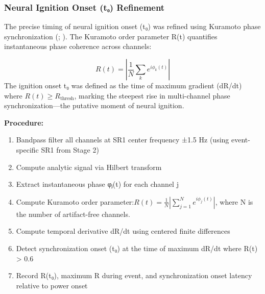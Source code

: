 \documentclass[11pt,a4paper]{article}
\begin{document}
\subsubsection{Neural Ignition Onset (t₀) Refinement}
The precise timing of neural ignition onset (t₀) was refined using Kuramoto phase synchronization (\cite{kuramoto1984chemical}; \cite{strogatz2000kuramoto}). The Kuramoto order parameter R(t) quantifies instantaneous phase coherence across channels:

\begin{displaymath}
R(t) = \left| \frac{1}{N} \sum_{k} e^{i\phi_k(t)} \right|
\end{displaymath}
The ignition onset t₀ was defined as the time of maximum gradient (dR/dt) where $R(t) \geq R_{\text{thresh}}$, marking the steepest rise in multi-channel phase synchronization—the putative moment of neural ignition.

\textbf{Procedure:}
\begin{enumerate}
\item Bandpass filter all channels at SR1 center frequency ±1.5 Hz (using event-specific SR1 from Stage 2)
\item Compute analytic signal via Hilbert transform
\item Extract instantaneous phase φⱼ(t) for each channel j
\item Compute Kuramoto order parameter:$R(t) = \frac{1}{N}\left|\sum_{j=1}^{N} e^{i\phi_j(t)}\right|$, where N is the number of artifact-free channels.
\item Compute temporal derivative dR/dt using centered finite differences
\item Detect synchronization onset (t₀) at the time of maximum dR/dt where R(t) > 0.6
\item Record R(t₀), maximum R during event, and synchronization onset latency relative to power onset
\end{enumerate}

\begin{table}[H]
    \centering
\end{table}
\end{document}
